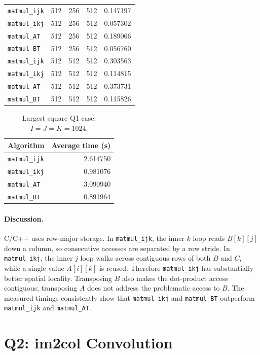 \documentclass[11pt]{article}
\begin{document}
\begin{longtable}{@{}lrrrl@{}}
\texttt{matmul\_ijk} & 512 & 256 & 512 & 0.147197 \\
\texttt{matmul\_ikj} & 512 & 256 & 512 & 0.057302 \\
\texttt{matmul\_AT} & 512 & 256 & 512 & 0.189066 \\
\texttt{matmul\_BT} & 512 & 256 & 512 & 0.056760 \\
\texttt{matmul\_ijk} & 512 & 512 & 512 & 0.303563 \\
\texttt{matmul\_ikj} & 512 & 512 & 512 & 0.114815 \\
\texttt{matmul\_AT} & 512 & 512 & 512 & 0.373731 \\
\texttt{matmul\_BT} & 512 & 512 & 512 & 0.115826 \\
\end{longtable}

\begin{table}[h]
\centering
\caption{Largest square Q1 case: $I=J=K=1024$.}\label{tab:q1-1024}
\begin{tabular}{lr}
\toprule
Algorithm & Average time (s) \\
\midrule
\texttt{matmul\_ijk} & 2.614750 \\
\texttt{matmul\_ikj} & 0.981076 \\
\texttt{matmul\_AT} & 3.090940 \\
\texttt{matmul\_BT} & 0.891964 \\
\bottomrule
\end{tabular}
\end{table}

\paragraph{Discussion.} C/C++ uses row-major storage. In \texttt{matmul\_ijk}, the inner $k$ loop reads $B[k][j]$ down a column, so consecutive accesses are separated by a row stride. In \texttt{matmul\_ikj}, the inner $j$ loop walks across contiguous rows of both $B$ and $C$, while a single value $A[i][k]$ is reused. Therefore \texttt{matmul\_ikj} has substantially better spatial locality. Transposing $B$ also makes the dot-product access contiguous; transposing $A$ does not address the problematic access to $B$. The measured timings consistently show that \texttt{matmul\_ikj} and \texttt{matmul\_BT} outperform \texttt{matmul\_ijk} and \texttt{matmul\_AT}.

\section{Q2: im2col Convolution}
\end{document}
